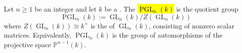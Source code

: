 \begin{definition} \label{definition:projective_general_linear_group_PGL_n_over_a_field}
Let $n \geq 1$ be an integer and let $k$ be a . The  \hl{$\operatorname{PGL}_n(k)$} is the quotient group
$$\operatorname{PGL}_n(k) := \operatorname{GL}_n(k) / Z(\operatorname{GL}_n(k))$$
where $Z(\operatorname{GL}_n(k)) \cong k^\times$ is the  of $\operatorname{GL}_n(k)$, consisting of nonzero scalar matrices. Equivalently, $\operatorname{PGL}_n(k)$ is the group of automorphisms of the projective space $\mathbb{P}^{n-1}(k)$.
\end{definition}
